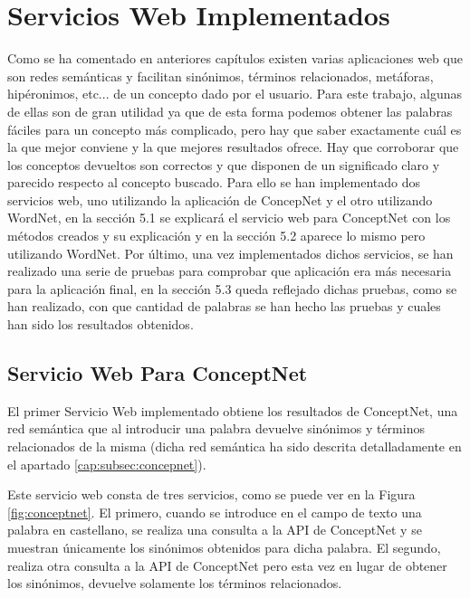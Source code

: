 \chapter{Servicios Web Implementados}
\label{cap:serviciosWebImplementados}

Como se ha comentado en anteriores capítulos existen varias aplicaciones web que son redes semánticas y facilitan sinónimos, términos relacionados, metáforas, hipéronimos, etc... de un concepto dado por el usuario. Para este trabajo, algunas de ellas son de gran utilidad ya que de esta forma podemos obtener las palabras fáciles para un concepto más complicado, pero hay que saber exactamente cuál es la que mejor conviene y la que mejores resultados ofrece. Hay que corroborar que los conceptos devueltos son correctos y que disponen de un significado claro y parecido respecto al concepto buscado. Para ello se han implementado dos servicios web, uno utilizando la aplicación de ConcepNet y el otro utilizando WordNet, en la sección 5.1 se explicará el servicio web para ConceptNet con los métodos creados y su explicación y en la sección 5.2 aparece lo mismo pero utilizando WordNet. Por último, una vez implementados dichos servicios, se han realizado una serie de pruebas para comprobar que aplicación era más necesaria para la aplicación final, en la sección 5.3 queda reflejado dichas pruebas, como se han realizado, con que cantidad de palabras se han hecho las pruebas y cuales han sido los resultados obtenidos.

\section{Servicio Web Para ConceptNet}
\label{cap:sec:servicioConceptnet}

El primer Servicio Web implementado obtiene los resultados de ConceptNet, una red semántica que al introducir una palabra devuelve sinónimos y términos relacionados de la misma (dicha red semántica ha sido descrita detalladamente en el apartado \ref{cap:subsec:concepnet}).


Este servicio web consta de tres servicios, como se puede ver en la Figura \ref{fig:conceptnet}. El primero, cuando se introduce en el campo de texto una palabra en castellano, se realiza una consulta a la API de ConceptNet y se muestran únicamente los sinónimos obtenidos para dicha palabra. El segundo, realiza otra consulta a la API de ConceptNet pero esta vez en lugar de obtener los sinónimos, devuelve solamente los términos relacionados.

